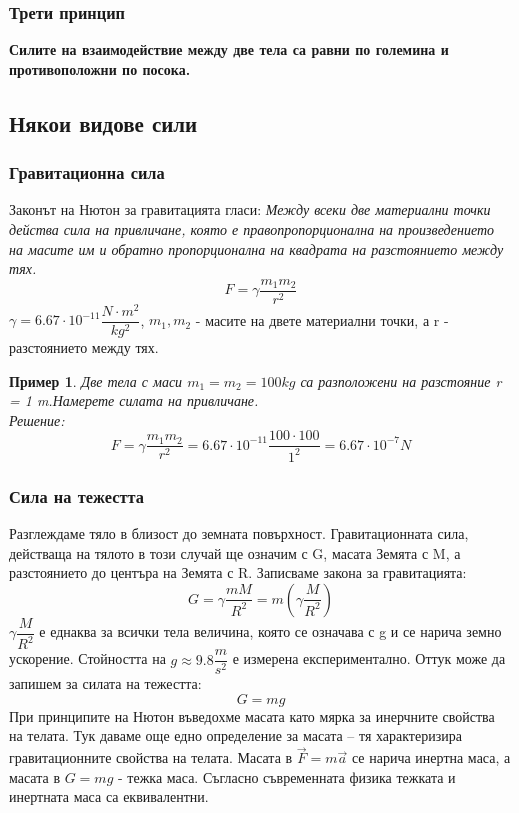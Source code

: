 \documentclass[fleqn]{article}
\newtheorem{example}{Пример}[subsection]
\begin{document}
\subsubsection{Трети принцип}
\textbf{Силите на взаимодействие между две тела са равни по големина и противоположни по посока.}

\subsection{Някои видове сили}

\subsubsection{Гравитационна сила}
Законът на Нютон за гравитацията гласи: \textit{Между всеки две материални точки действа сила на привличане, която е правопропорционална на произведението на масите им и обратно пропорционална на квадрата на разстоянието между тях.} \\
$$F = \gamma \dfrac{m_1 m_2}{r^2}$$
$\gamma = 6.67 \cdot 10^{-11} \dfrac{N \cdot m^2}{kg^2}$, $m_1, m_2$ - масите на двете материални точки, а r - разстоянието между тях. 

\begin{example}
Две тела с маси $m_1 =m_2 = 100 kg$ са разположени на разстояние r = 1 m.Намерете силата на привличане. \\
Решение: \\
$$F = \gamma \dfrac{m_1 m_2}{r^2} =  6.67 \cdot 10^{-11}  \dfrac{100 \cdot 100}{1^2} = 6.67 \cdot 10^{-7} N$$
\end{example}


\subsubsection{Сила на тежестта}
Разглеждаме тяло в близост до земната повърхност. Гравитационната сила, действаща на тялото в този случай ще означим с G, масата Земята с M, а разстоянието до центъра на Земята с R. Записваме закона за гравитацията:
$$G = \gamma \dfrac{mM}{R^2} = m \left( \gamma \dfrac{M}{R^2} \right)$$
$\gamma \dfrac{M}{R^2} $ е еднаква за всички тела величина, която се означава с g и се нарича земно ускорение. Стойността на $g \approx 9.8 \dfrac{m}{s^2}$ е измерена експериментално. Оттук може да запишем за силата на тежестта:
$$G = mg$$
При принципите на Нютон въведохме масата като мярка за инерчните свойства на телата. Тук даваме още едно определение за масата – тя характеризира гравитационните свойства на телата. Масата в  $\vec{F} = m \vec{a}$ се нарича инертна маса, а масата в $G = mg$ - тежка маса. Съгласно съвременната физика тежката и инертната маса са еквивалентни.
\end{document}
